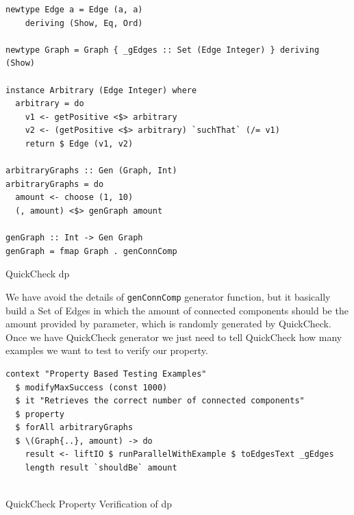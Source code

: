 \documentclass[preprint]{elsarticle}
\begin{document}
\begin{listing}[H]
  \begin{verbatim}      
newtype Edge a = Edge (a, a)
    deriving (Show, Eq, Ord)
  
newtype Graph = Graph { _gEdges :: Set (Edge Integer) } deriving (Show)
  
instance Arbitrary (Edge Integer) where
  arbitrary = do
    v1 <- getPositive <$> arbitrary
    v2 <- (getPositive <$> arbitrary) `suchThat` (/= v1)
    return $ Edge (v1, v2)
  
arbitraryGraphs :: Gen (Graph, Int)
arbitraryGraphs = do
  amount <- choose (1, 10)
  (, amount) <$> genGraph amount
  
genGraph :: Int -> Gen Graph
genGraph = fmap Graph . genConnComp
\end{verbatim}
\caption{QuickCheck \acrshort{dp}}
\label{src:haskell:7}
\end{listing}

We have avoid the details of \texttt{genConnComp} generator function, but it basically build a Set of Edges 
in which the amount of connected components should be the amount provided by parameter, which is randomly generated by QuickCheck.
Once we have QuickCheck generator we just need to tell QuickCheck how many examples we want to test to verify our property.

\begin{listing}[H]
\begin{verbatim}      
context "Property Based Testing Examples"
  $ modifyMaxSuccess (const 1000)
  $ it "Retrieves the correct number of connected components"
  $ property
  $ forAll arbitraryGraphs 
  $ \(Graph{..}, amount) -> do 
    result <- liftIO $ runParallelWithExample $ toEdgesText _gEdges
    length result `shouldBe` amount
    
\end{verbatim}
\caption{QuickCheck Property Verification of \acrshort{dp}}
\label{src:haskell:8}
\end{listing}
\end{document}
